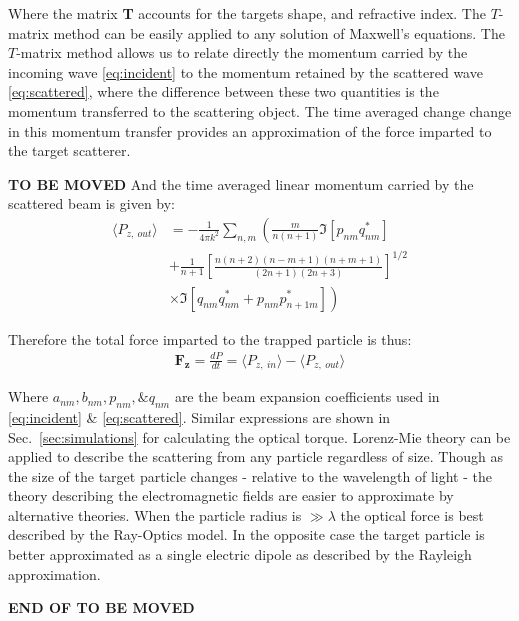 Where the matrix \textbf{T} accounts for the targets shape, 
and refractive index. The $T$-matrix method can be easily 
applied to any solution of Maxwell's equations. The $T$-matrix
method allows us to relate directly the momentum carried by 
the incoming wave \ref{eq:incident} to the momentum retained
by the scattered wave \ref{eq:scattered}, where the difference 
between these two quantities is the momentum transferred to
the scattering object. The time averaged change change in 
this momentum transfer provides an approximation of the force 
imparted to the target scatterer. 


\textbf{TO BE MOVED}
And the time averaged linear momentum carried by the scattered 
beam is given by:
\begin{equation}
	\label{eq:linear_momentum_out}
	\begin{split}
		\langle P_{z,\ out} \rangle
		&=
		-\frac{1}{4\pi k^2}\sum_{n,m} \left(\frac{m}{n(n+1)}\Im[p_{nm}q^*_{nm}] \right.
		\\ 
		&+\frac{1}{n+1}\left[\frac{n(n+2)(n-m+1)(n+m+1)}{(2n+1)(2n+3)} \right]^{1/2}
		\\
		& \left.\times\Im[q_{nm}q^*_{nm}+p_{nm}p^*_{n+1m}] \right)
	\end{split}
\end{equation}

Therefore the total force imparted to the trapped particle is thus:
\begin{align}
	\boldsymbol{F_z} =\frac{dP}{dt} = \langle P_{z,\ in}\rangle 
	-\langle P_{z,\ out}\rangle
	\label{eq:Fz}
\end{align}

\noindent
Where $a_{nm}, b_{nm}, p_{nm}, \& q_{nm}$ are the beam expansion 
coefficients used in \eqref{eq:incident} \& \eqref{eq:scattered}.
Similar expressions are shown in Sec.~\ref{sec:simulations} for 
calculating the optical torque. Lorenz-Mie theory can be applied 
to describe the scattering from any particle regardless of size.
Though as the size of the target particle changes - relative to 
the wavelength of light - the theory describing the electromagnetic 
fields are easier to approximate by alternative theories. When the 
particle radius is $\gg \lambda$ the optical force is best described 
by the Ray-Optics model. In the opposite case the target particle is 
better approximated as a single electric dipole as described by 
the Rayleigh approximation.  

\textbf{END OF TO BE MOVED}

